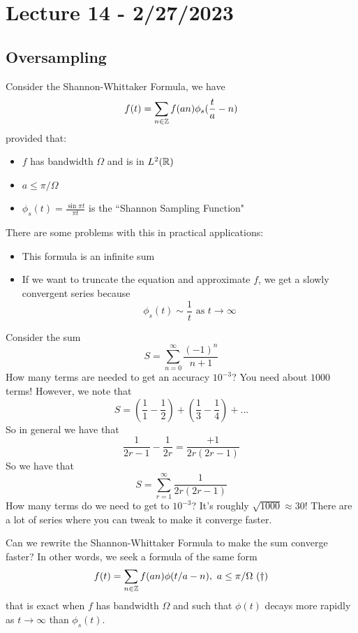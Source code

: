\documentclass{article}
\begin{document}
\newpage
\section{Lecture 14 - 2/27/2023}

\subsection{Oversampling}

Consider the Shannon-Whittaker Formula, we have
\[f(t) = \sum_{n \in \mathbb{Z}} f(an) \phi_s(\frac{t}{a} - n)\]
provided that:
\begin{itemize}
    \item $f$ has bandwidth $\Omega$ and is in $L^2(\mathbb{R})$
    \item $a \leq \pi/\Omega$
    \item $\phi_s(t) = \frac{\sin \pi t}{\pi t}$ is the ``Shannon Sampling Function"
\end{itemize}

There are some problems with this in practical applications:
\begin{itemize}
    \item This formula is an infinite sum
    \item If we want to truncate the equation and approximate $f$, we get a slowly convergent series because
    \[\phi_s(t) \sim \frac{1}{t} \text{ as } t \to \infty\]
\end{itemize}

\begin{example}
    Consider the sum
    \[S = \sum_{n = 0}^\infty \frac{(-1)^n}{n+1}\]
    How many terms are needed to get an accuracy $10^{-3}$? You need about $1000$ terms! However, we note that
    \[S = (\frac{1}{1} - \frac{1}{2}) + (\frac{1}{3} - \frac{1}{4}) + ...\]
    So in general we have that
    \[\frac{1}{2r - 1} - \frac{1}{2r} = \frac{+1}{2r(2r - 1)}\]
    So we have that
    \[S = \sum_{r = 1}^\infty \frac{1}{2r(2r - 1)}\]
    How many terms do we need to get to $10^{-3}$? It's roughly $\sqrt{1000} \approx 30$! There are a lot of series where you can tweak to make it converge faster.
\end{example}

\begin{question}
    Can we rewrite the Shannon-Whittaker Formula to make the sum converge faster? In other words, we seek a formula of the same form
    \[f(t) = \sum_{n \in \mathbb{Z}} f(an) \phi(t/a - n),\ a \leq \pi/\Omega\ (\dagger)\]
    that is exact when $f$ has bandwidth $\Omega$ and such that $\phi(t)$ decays more rapidly as $t \to \infty$ than $\phi_s(t)$.
\end{question}
\end{document}
